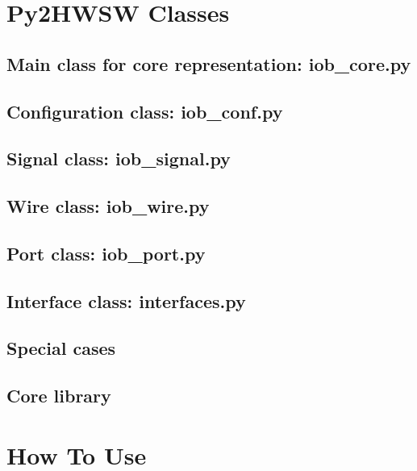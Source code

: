\documentclass{ug}
\begin{document}
\section{Py2HWSW Classes}
\label{sec:py_classes}

\subsection{Main class for core representation: iob\_core.py}
\label{sec:iob_core}


\subsection{Configuration class: iob\_conf.py}
\label{sec:iob_conf}


\subsection{Signal class: iob\_signal.py}
\label{sec:iob_signal}


\subsection{Wire class: iob\_wire.py}
\label{sec:iob_wire}


\subsection{Port class: iob\_port.py}
\label{sec:iob_port}


\subsection{Interface class: interfaces.py}
\label{sec:if_gen}


\subsection{Special cases}
\label{sec:special_cases}


\subsection{Core library}
\label{sec:core_lib}


%
%
\ifdefined\SECTIONCLEARPAGE
\clearpage
\fi
\section{How To Use}
\label{sec:usage}
\end{document}
